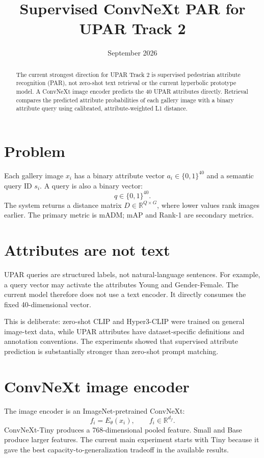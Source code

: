 \documentclass[11pt]{article}
\title{Supervised ConvNeXt PAR for UPAR Track 2}
\author{}
\date{September 2026}
\begin{document}
\maketitle

\begin{abstract}
The current strongest direction for UPAR Track 2 is supervised pedestrian attribute recognition (PAR), not zero-shot text retrieval or the current hyperbolic prototype model. A ConvNeXt image encoder predicts the 40 UPAR attributes directly. Retrieval compares the predicted attribute probabilities of each gallery image with a binary attribute query using calibrated, attribute-weighted L1 distance.
\end{abstract}

\section{Problem}
Each gallery image $x_i$ has a binary attribute vector $a_i\in\{0,1\}^{40}$ and a semantic query ID $s_i$. A query is also a binary vector:
\[
q\in\{0,1\}^{40}.
\]
The system returns a distance matrix $D\in\mathbb{R}^{Q\times G}$, where lower values rank images earlier. The primary metric is mADM; mAP and Rank-1 are secondary metrics.

\section{Attributes are not text}
UPAR queries are structured labels, not natural-language sentences. For example, a query vector may activate the attributes Young and Gender-Female. The current model therefore does not use a text encoder. It directly consumes the fixed 40-dimensional vector.

This is deliberate: zero-shot CLIP and Hyper3-CLIP were trained on general image-text data, while UPAR attributes have dataset-specific definitions and annotation conventions. The experiments showed that supervised attribute prediction is substantially stronger than zero-shot prompt matching.

\section{ConvNeXt image encoder}
The image encoder is an ImageNet-pretrained ConvNeXt:
\[
f_i=E_\theta(x_i),\qquad f_i\in\mathbb{R}^{d_f}.
\]
ConvNeXt-Tiny produces a 768-dimensional pooled feature. Small and Base produce larger features. The current main experiment starts with Tiny because it gave the best capacity-to-generalization tradeoff in the available results.
\end{document}
